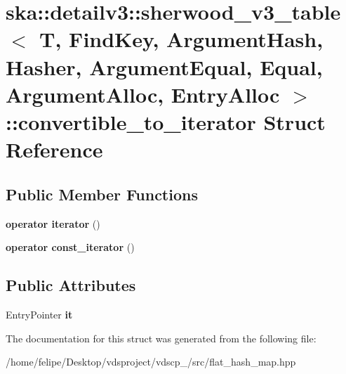 \section{ska\+:\+:detailv3\+:\+:sherwood\+\_\+v3\+\_\+table$<$ T, Find\+Key, Argument\+Hash, Hasher, Argument\+Equal, Equal, Argument\+Alloc, Entry\+Alloc $>$\+:\+:convertible\+\_\+to\+\_\+iterator Struct Reference}
\label{structska_1_1detailv3_1_1sherwood__v3__table_1_1convertible__to__iterator}
\subsection*{Public Member Functions}
\begin{DoxyCompactItemize}
\item 
{\bfseries operator iterator} ()\label{structska_1_1detailv3_1_1sherwood__v3__table_1_1convertible__to__iterator_a07b15b09cfd1165e125dab6dcb5225f0}

\item 
{\bfseries operator const\+\_\+iterator} ()\label{structska_1_1detailv3_1_1sherwood__v3__table_1_1convertible__to__iterator_a27528469b747c52bbf018039cdfac1f7}

\end{DoxyCompactItemize}
\subsection*{Public Attributes}
\begin{DoxyCompactItemize}
\item 
Entry\+Pointer {\bfseries it}\label{structska_1_1detailv3_1_1sherwood__v3__table_1_1convertible__to__iterator_adacc35f9cf624553e7ca30553f529295}

\end{DoxyCompactItemize}


The documentation for this struct was generated from the following file\+:\begin{DoxyCompactItemize}
\item 
/home/felipe/\+Desktop/vdsproject/vdscp\+\_/src/flat\+\_\+hash\+\_\+map.\+hpp\end{DoxyCompactItemize}
